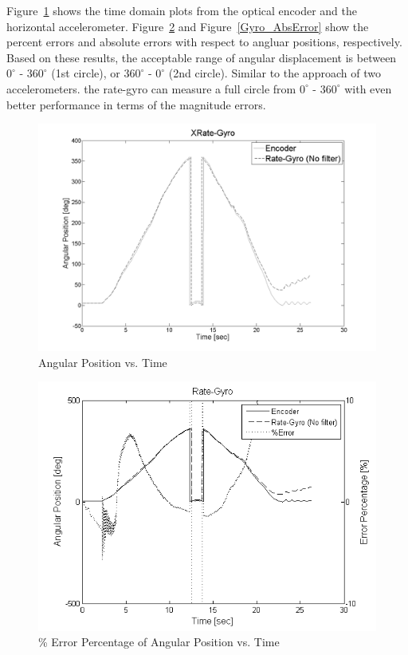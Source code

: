\documentclass{article}
\theoremstyle{plain}
\theoremstyle{definition}
\theoremstyle{remark}
\begin{document}
Figure~\ref{Gyro_TimeDomain} shows the time domain plots from the optical encoder and the horizontal accelerometer. Figure~\ref{Gyro_ErrorPercentage} and Figure~\ref{Gyro_AbsError} show the percent errors and absolute errors with respect to angluar positions, respectively. Based on these results, the acceptable range of angular displacement is between $0^\circ$ - $360^\circ$ (1st circle), or $360^\circ$ - $0^\circ$ (2nd circle). Similar to the approach of two accelerometers. the rate-gyro can measure a full circle from $0^\circ$ - $360^\circ$ with even better performance in terms of the magnitude errors.\\

\begin{figure}[hbt]
\begin{center}
\includegraphics[width = 13cm]{Gyro_TimeDomain.png}
\caption{Angular Position vs. Time}
\label{Gyro_TimeDomain}
\end{center}
\end{figure}

\begin{figure}[hbt]
\begin{center}
\includegraphics[width = 13cm]{Gyro_ErrorPercentage.png}
\caption{\% Error Percentage of Angular Position vs. Time}
\label{Gyro_ErrorPercentage}
\end{center}
\end{figure}
\end{document}
